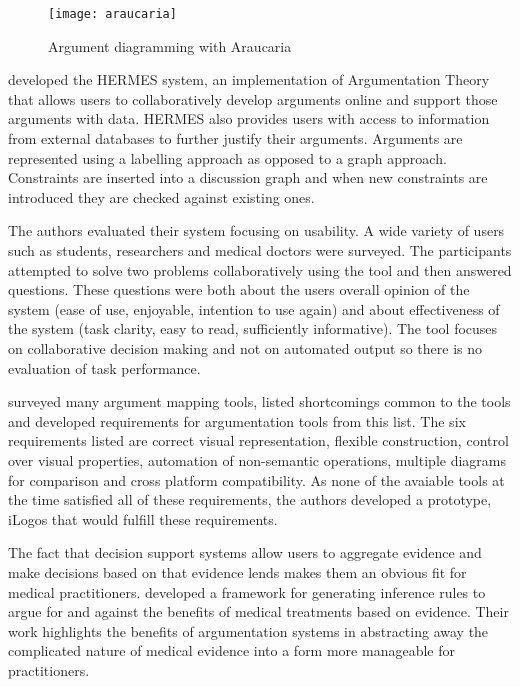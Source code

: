 \begin{figure}[!h]
\centering
\texttt{[image: araucaria]}
\caption{Argument diagramming with Araucaria}
\label{fig:my_label}
\end{figure}

\cite{karacapilidis2001computer} developed the HERMES system, an implementation of Argumentation Theory that allows users to collaboratively develop arguments online and support those arguments with data. HERMES also provides users with access to information from external databases to further justify their arguments. Arguments are represented using a labelling approach as opposed to a graph approach. Constraints are inserted into a discussion graph and when new constraints are introduced they are checked against existing ones.

The authors evaluated their system focusing on usability. A wide variety of users such as students, researchers and medical doctors were surveyed. The participants attempted to solve two problems collaboratively using the tool and then answered questions. These questions were both about the users overall opinion of the system (ease of use, enjoyable, intention to use again) and about effectiveness of the system (task clarity, easy to read, sufficiently informative). The tool focuses on collaborative decision making and not on automated output so there is no evaluation of task performance.

\cite{easterday2009design} surveyed many argument mapping tools, listed shortcomings common to the tools and developed requirements for argumentation tools from this list.
The six requirements listed are correct visual representation, flexible construction, control over visual properties, automation of non-semantic operations, multiple diagrams for comparison and cross platform compatibility. As none of the avaiable tools at the time satisfied all of these requirements, the authors developed a prototype, iLogos that would fulfill these requirements.

The fact that decision support systems allow users to aggregate evidence and make decisions based on that evidence lends makes them an obvious fit for medical practitioners. \cite{hunter2010argumentation} developed a framework for generating inference rules to argue for and against the benefits of medical treatments based on evidence. Their work highlights the benefits of argumentation systems in abstracting away the complicated nature of medical evidence into a form more manageable for practitioners.

